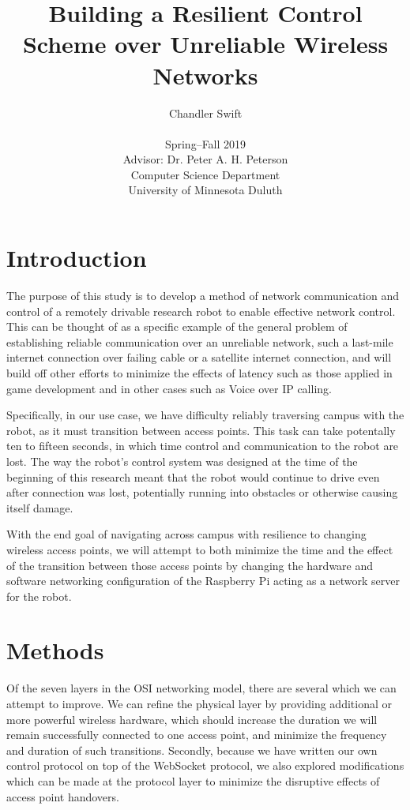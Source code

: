 \documentclass{IEEEtran}
\title{Building a Resilient Control Scheme over Unreliable Wireless Networks}
\author{Chandler Swift \\ ~ \\
  Spring--Fall 2019 \\
  Advisor: Dr. Peter A. H. Peterson \\
  Computer Science Department \\
  University of Minnesota Duluth
}
\begin{document}
\maketitle

\section{Introduction}
The purpose of this study is to develop a method of network communication and
control of a remotely drivable research robot to enable effective network
control. This can be thought of as a specific example of the general problem
of establishing reliable communication over an unreliable network, such a
last-mile internet connection over failing cable or a satellite internet
connection, and will build off other efforts to minimize the effects of
latency such as those applied in game development\cite{reducinglag} and in other
cases such as Voice over IP calling\cite{briscoe2014reducing}.

Specifically, in our use case, we have difficulty reliably traversing campus
with the robot, as it must transition between access points. This task can take
potentally ten to fifteen seconds, in which time control and communication to
the robot are lost. The way the robot's control system was designed at the time
of the beginning of this research meant that the robot would continue to drive
even after connection was lost, potentially running into obstacles or
otherwise causing itself damage.

With the end goal of navigating across campus with resilience to changing
wireless access points, we will attempt to both minimize the time and the
effect of the transition between those access points by changing the
hardware and software networking configuration of the Raspberry Pi acting
as a network server for the robot.

\section{Methods}
Of the seven layers in the OSI networking model, there are several which we
can attempt to improve. We can refine the physical layer by providing additional or
more powerful wireless hardware, which should increase the duration we will
remain successfully connected to one access point, and minimize the frequency
and duration of such transitions. Secondly, because we have written our own
control protocol on top of the WebSocket protocol\cite{protocol}, we also 
explored modifications which can be made at the
protocol layer to minimize the disruptive effects of access point handovers.
\end{document}
